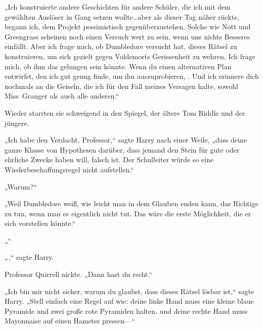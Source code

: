 „Ich konstruierte andere Geschichten für andere Schüler, die ich mit dem gewählten Auslöser in Gang setzen wollte…aber als dieser Tag näher rückte, begann ich, dem Projekt pessimistisch gegenüberzustehen. Solche wie Nott und Greengrass scheinen noch einen Versuch wert zu sein, wenn uns nichts Besseres einfällt. Aber ich frage mich, ob Dumbledore versucht hat, dieses Rätsel zu konstruieren, um sich gezielt gegen Voldemorts Gerissenheit zu wehren. Ich frage mich, ob ihm das gelungen sein könnte. Wenn du einen alternativen Plan entwirfst, den ich gut genug finde, um ihn auszuprobieren, . Und ich erinnere dich nochmals an die Geiseln, die ich für den Fall meines Versagen halte, sowohl Miss~Granger als auch alle anderen.“

Wieder starrten sie schweigend in den Spiegel, der ältere Tom Riddle und der jüngere.

„Ich habe den Verdacht, Professor,“ sagte Harry nach einer Weile, „dass deine ganze Klasse von Hypothesen darüber, dass jemand den Stein für gute oder ehrliche Zwecke haben will, falsch ist. Der Schulleiter würde so eine Wiederbeschaffungsregel nicht aufstellen.“

„Warum?“

„Weil Dumbledore weiß, wie leicht man in dem Glauben enden kann, das Richtige zu tun, wenn man es eigentlich nicht tut. Das wäre die erste Möglichkeit, die er sich vorstellen könnte.“

„“

„,“ sagte Harry.

Professor Quirrell nickte.
„Dann hast du recht.“

„Ich bin mir nicht sicher, warum du glaubst, dass dieses Rätsel lösbar ist,“ sagte Harry. „Stell einfach eine Regel auf wie: deine linke Hand muss eine kleine blaue Pyramide und zwei große rote Pyramiden halten, und deine rechte Hand muss Mayonnaise auf einen Hamster pressen—“

